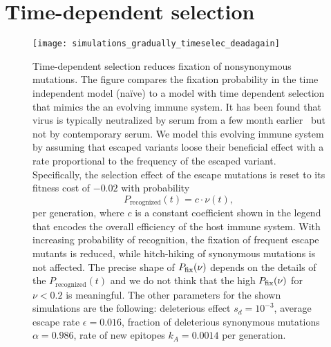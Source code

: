 
\section{Time-dependent selection}
\begin{figure}[h]
\begin{center}
\texttt{[image: simulations\_gradually\_timeselec\_deadagain]}
\caption{
Time-dependent selection reduces fixation of nonsynonymous mutations. The figure
compares the fixation probability in the time independent model (na\"ive) to
a model with time dependent selection that mimics the an evolving immune system.
It has been found that virus is typically neutralized by serum from a few month
earlier~\citep{richman_rapid_2003} but not by contemporary serum. We model this
evolving immune system by assuming that escaped variants loose their beneficial
effect with a rate proportional to the frequency of the escaped variant. 
Specifically, the selection effect of the escape mutations is
reset to its fitness cost of $-0.02$ with probability
\[ P_\text{recognized}(t) = c \cdot \nu(t), \] 
per generation, where $c$ is a constant coefficient shown in the legend that
encodes the overall efficiency of the host immune system. With increasing
probability of recognition, the fixation of frequent escape mutants is reduced,
while hitch-hiking of synonymous mutations is not affected. The precise
shape of $P_{\mathrm{fix}}(\nu)$ depends on the details of the $P_\text{recognized}(t)$ and 
we do not think that the high $P_{\mathrm{fix}}(\nu)$ for $\nu<0.2$ is meaningful.
The other parameters for the shown simulations are
the following: deleterious effect $s_d = 10^{-3}$, average escape rate $\epsilon = 0.016$,
fraction of deleterious synonymous mutations $\alpha = 0.986$, rate of new epitopes
$k_A=0.0014$ per generation.
}
\label{fig:tds}
\end{center}
\end{figure}

